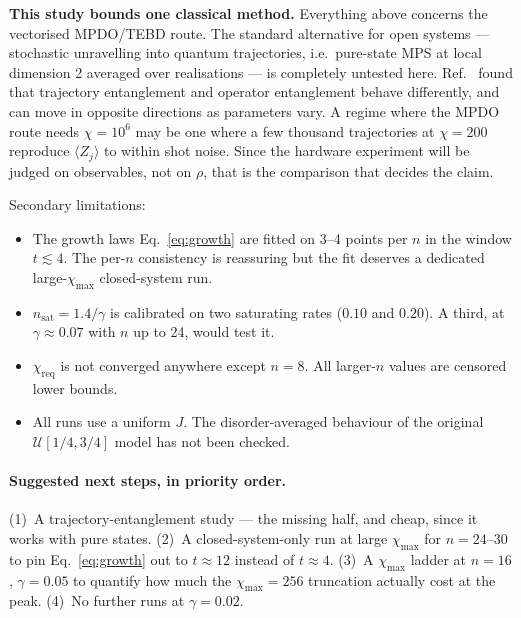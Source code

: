\documentclass[11pt,a4paper]{article}
\newcommand{\chreq}{\chi_{\mathrm{req}}}
\newcommand{\nsat}{n_{\mathrm{sat}}}
\begin{document}
\begin{warnbox}
\textbf{This study bounds one classical method.} Everything above concerns the
vectorised MPDO/TEBD route. The standard alternative for open systems ---
stochastic unravelling into quantum trajectories, i.e.\ pure-state MPS at local
dimension 2 averaged over realisations --- is completely untested here.
Ref.~\cite{preisser2023comparing} found that trajectory entanglement and
operator entanglement behave differently, and can move in opposite directions as
parameters vary. A regime where the MPDO route needs $\chi=10^6$ may be one
where a few thousand trajectories at $\chi=200$ reproduce $\langle Z_j\rangle$ to
within shot noise. Since the hardware experiment will be judged on observables,
not on $\rho$, that is the comparison that decides the claim.
\end{warnbox}

Secondary limitations:
\begin{itemize}[leftmargin=1.4em,itemsep=2pt]
\item The growth laws Eq.~\eqref{eq:growth} are fitted on 3--4 points per $n$ in
  the window $t\lesssim4$. The per-$n$ consistency is reassuring but the fit
  deserves a dedicated large-$\chi_{\max}$ closed-system run.
\item $\nsat=1.4/\gamma$ is calibrated on two saturating rates ($0.10$ and
  $0.20$). A third, at $\gamma\approx0.07$ with $n$ up to 24, would test it.
\item $\chreq$ is not converged anywhere except $n=8$. All larger-$n$ values are
  censored lower bounds.
\item All runs use a uniform $J$. The disorder-averaged behaviour of the
  original $\mathcal{U}[1/4,3/4]$ model has not been checked.
\end{itemize}

\paragraph{Suggested next steps, in priority order.}
(1)~A trajectory-entanglement study --- the missing half, and cheap, since it
works with pure states.
(2)~A closed-system-only run at large $\chi_{\max}$ for $n=24$--$30$ to pin
Eq.~\eqref{eq:growth} out to $t\approx12$ instead of $t\approx4$.
(3)~A $\chi_{\max}$ ladder at $n=16$, $\gamma=0.05$ to quantify how much the
$\chi_{\max}=256$ truncation actually cost at the peak.
(4)~No further runs at $\gamma=0.02$.
\end{document}
